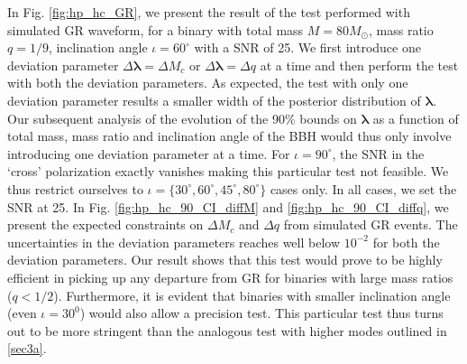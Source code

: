 \documentclass[prd,preprintnumbers,twocolumn,eqsecnum,floatfix,a4paper,nofootinbib,superscriptaddress]{revtex4}
\newcommand{\blambda}{\bm{\lambda}}
\begin{document}
In Fig. \ref{fig:hp_hc_GR}, we present the result of the test performed with simulated GR waveform, for a binary with total mass $M = 80M_{\odot}$, mass ratio $q=1/9$, inclination angle $ {\iota}=60^{\circ} $ with a SNR of 25. We first introduce one deviation parameter $\Delta\blambda = {\Delta M_c}$ or $\Delta\blambda = {\Delta q}$ at a time and then perform the test with both the deviation parameters. As expected, the test with only one deviation parameter results a smaller width of the posterior distribution of $\blambda$. Our subsequent analysis of the evolution of the 90\% bounds on $\blambda$ as a function of total mass, mass ratio and inclination angle of the BBH would thus only involve introducing one deviation parameter at a time. For $\iota=90^{\circ}$, the SNR in the `cross' polarization exactly vanishes making this particular test not feasible. We thus restrict ourselves to ${\iota}=\{30^{\circ},60^{\circ},45^{\circ},80^{\circ}\}$ cases only. In all cases, we set the SNR at 25. In Fig. \ref{fig:hp_hc_90_CI_diffM} and \ref{fig:hp_hc_90_CI_diffq}, we present the expected constraints on ${\Delta M_c}$ and ${\Delta q}$ from simulated GR events. The uncertainties in the deviation parameters reaches well below $10^{-2}$ for both the deviation parameters. Our result shows that this test would prove to be highly efficient in picking up any departure from GR for binaries with large mass ratios ($q < 1/ 2$). Furthermore, it is evident that binaries with smaller inclination angle (even $\iota=30^0$) would also allow a precision test. This particular test thus turns out to be more stringent than the analogous test with higher modes outlined in \ref{sec3a}.  
  
\end{document}
